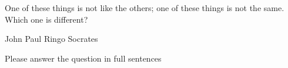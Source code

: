 \documentclass[addpoints]{exam}
\begin{document}
\begin{center}
\end{center}
\vspace{0.1in}
\vspace{0.2in}

\begin{questions}

\question
One of these things is not like the others; one of these things
is not
the same. Which one is different?
\begin{choices}
\choice John
\choice Paul
\choice Ringo
\choice Socrates
\end{choices}

\question
Please answer the question in full sentences
\fillwithlines{2cm}

\end{questions}
\end{document}
